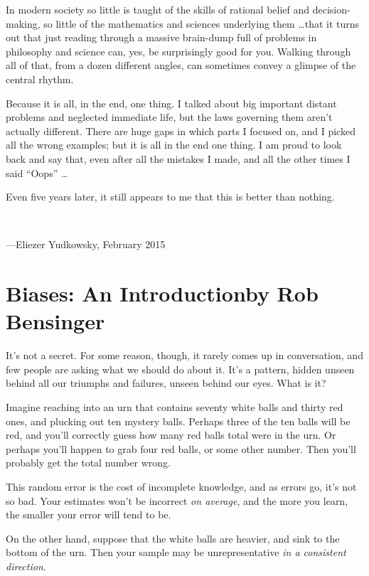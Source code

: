 \documentclass[letterpaper]{book}
\newcounter{mysection}
\newcommand{\mysectiontwo}[2]{
  \section*{#2}
  \addcontentsline{toc}{section}{#1}
  \setcounter{footnote}{0}
}
\begin{document}
{
 In modern society so little is taught of the skills of rational
belief and decision-making, so little of the mathematics and sciences
underlying them \ldots that it turns out that just reading through a
massive brain-dump full of problems in philosophy and science can, yes,
be surprisingly good for you. Walking through all of that, from a dozen
different angles, can sometimes convey a glimpse of the central
rhythm.}

{
 Because it is all, in the end, one thing. I talked about big
important distant problems and neglected immediate life, but the laws
governing them aren't actually different. There are
huge gaps in which parts I focused on, and I picked all the wrong
examples; but it is all in the end one thing. I am proud to look back
and say that, even after all the mistakes I made, and all the other
times I said ``Oops'' \ldots}

{
 Even five years later, it still appears to me that this is better
than nothing.}

{
 ~}

{\raggedleft
 {}---Eliezer Yudkowsky,\newline
 February 2015
\par}

\mysectiontwo{Biases: An Introduction}{Biases: An Introduction\newline by Rob Bensinger}

{
 It's not a secret. For some reason, though, it
rarely comes up in conversation, and few people are asking what we
should do about it. It's a pattern, hidden unseen
behind all our triumphs and failures, unseen behind our eyes. What is
it?}

{
 Imagine reaching into an urn that contains seventy white balls and
thirty red ones, and plucking out ten mystery balls. Perhaps three of
the ten balls will be red, and you'll correctly guess
how many red balls total were in the urn. Or perhaps
you'll happen to grab four red balls, or some other
number. Then you'll probably get the total number
wrong.}

{
 This random error is the cost of incomplete knowledge, and as
errors go, it's not so bad. Your estimates
won't be incorrect \textit{on average}, and the more
you learn, the smaller your error will tend to be.}

{
 On the other hand, suppose that the white balls are heavier, and
sink to the bottom of the urn. Then your sample may be unrepresentative
\textit{in a consistent direction}.}
\end{document}
